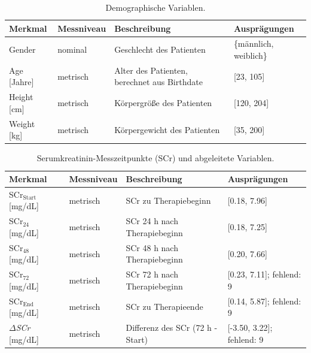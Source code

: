 \documentclass[a4paper,12pt]{article}
\begin{document}
\begin{table}[H]
\small
\centering
\begin{tabular}{p{3.2cm} p{2cm} p{5cm} p{3cm}}
    \toprule
    Merkmal & Messniveau & Beschreibung & Ausprägungen \\\midrule
    Gender & nominal & Geschlecht des Patienten & \{männlich, \newline weiblich\} \\
    Age [Jahre] & metrisch & Alter des Patienten, \newline berechnet aus Birthdate & [23, 105] \\
    Height [cm] & metrisch & Körpergröße des Patienten & [120, 204] \\
    Weight [kg] & metrisch & Körpergewicht des Patienten & [35, 200] \\\bottomrule
\end{tabular}
\caption{\label{tab:demo}Demographische Variablen.}
\end{table}

\begin{table}[H]
\small
\centering
\begin{tabular}{p{3.2cm} p{2cm} p{5cm} p{3cm}}
    \toprule
    Merkmal & Messniveau & Beschreibung & Ausprägungen \\\midrule
    SCr$_{\mathrm{Start}}$ [mg/dL] & metrisch & SCr zu Therapiebeginn & [0.18, 7.96] \\
    SCr$_{24}$ [mg/dL] & metrisch & SCr 24 h nach Therapiebeginn & [0.18, 7.25] \\
    SCr$_{48}$ [mg/dL] & metrisch & SCr 48 h nach Therapiebeginn & [0.20, 7.66] \\
    SCr$_{72}$ [mg/dL] & metrisch & SCr 72 h nach Therapiebeginn & [0.23, 7.11]; \newline fehlend: 9  \\
    SCr$_{\mathrm{End}}$ [mg/dL] & metrisch & SCr zu Therapieende & [0.14, 5.87]; \newline fehlend: 9  \\
    \textit{$\Delta$SCr} [mg/dL] & metrisch & Differenz des SCr \newline (72 h - Start) & [-3.50, 3.22]; \newline fehlend: 9\\\bottomrule
\end{tabular}
\caption{\label{tab:SCr}Serumkreatinin-Messzeitpunkte (SCr) und abgeleitete Variablen.}
\end{table}
\end{document}
